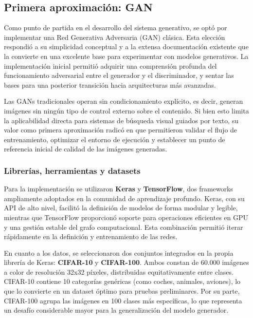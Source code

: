 \subsection{Primera aproximación: GAN}

Como punto de partida en el desarrollo del sistema generativo, se optó por implementar una Red Generativa Adversaria (GAN) clásica. Esta elección respondió a su simplicidad conceptual y a la extensa documentación existente que la convierte en una excelente base para experimentar con modelos generativos. La implementación inicial permitió adquirir una comprensión profunda del funcionamiento adversarial entre el generador y el discriminador, y sentar las bases para una posterior transición hacia arquitecturas más avanzadas.

Las GANs tradicionales operan sin condicionamiento explícito, es decir, generan imágenes sin ningún tipo de control externo sobre el contenido. Si bien esto limita la aplicabilidad directa para sistemas de búsqueda visual guiados por texto, su valor como primera aproximación radicó en que permitieron validar el flujo de entrenamiento, optimizar el entorno de ejecución y establecer un punto de referencia inicial de calidad de las imágenes generadas.

\subsubsection{Librerías, herramientas y datasets}

Para la implementación se utilizaron \textbf{Keras} y \textbf{TensorFlow}, dos frameworks ampliamente adoptados en la comunidad de aprendizaje profundo. Keras, con su API de alto nivel, facilitó la definición de modelos de forma modular y legible, mientras que TensorFlow proporcionó soporte para operaciones eficientes en GPU y una gestión estable del grafo computacional. Esta combinación permitió iterar rápidamente en la definición y entrenamiento de las redes.

En cuanto a los datos, se seleccionaron dos conjuntos integrados en la propia librería de Keras: \textbf{CIFAR-10} y \textbf{CIFAR-100}. Ambos constan de 60.000 imágenes a color de resolución 32x32 píxeles, distribuidas equitativamente entre clases. CIFAR-10 contiene 10 categorías genéricas (como coches, animales, aviones), lo que lo convierte en un dataset óptimo para pruebas preliminares. Por su parte, CIFAR-100 agrupa las imágenes en 100 clases más específicas, lo que representa un desafío considerable mayor para la generalización del modelo generador.

